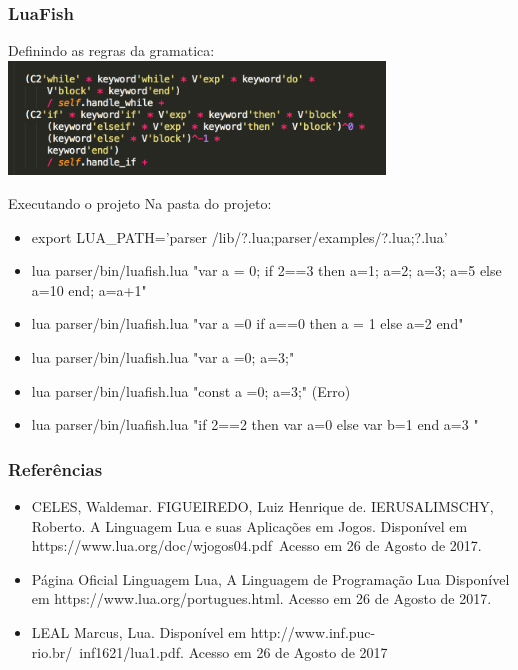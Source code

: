 \documentclass{beamer}
\begin{document}
\begin{frame}
    \frametitle{LuaFish}
    Definindo as regras da gramatica:\newline
    \includegraphics[width=10cm]{images/grammar_rule.png}
    \newline
    
\end{frame}


\begin{frame}{Executando o projeto}
    Na pasta do projeto:
    \begin{itemize} 
        \item export LUA\_PATH='parser /lib/?.lua;parser/examples/?.lua;?.lua'
        \item lua parser/bin/luafish.lua "var a = 0; if 2==3 then a=1; a=2; a=3; a=5 else a=10 end; a=a+1"
        \item lua parser/bin/luafish.lua "var a =0 if a==0 then a = 1 else a=2 end"
        \item lua parser/bin/luafish.lua "var a =0; a=3;"
        \item lua parser/bin/luafish.lua "const a =0; a=3;" (Erro)
        \item lua parser/bin/luafish.lua "if 2==2 then var a=0 else var b=1 end a=3 "
    \end{itemize}
\end{frame}

\begin{frame}
    \frametitle{Referências}
    \begin{itemize}
        \item CELES, Waldemar. FIGUEIREDO, Luiz Henrique de. IERUSALIMSCHY, Roberto. A Linguagem Lua e suas Aplicações em Jogos. Disponível em https://www.lua.org/doc/wjogos04.pdf\  Acesso em 26 de Agosto de 2017.
        \item Página Oficial Linguagem Lua, A Linguagem de Programação Lua Disponível em https://www.lua.org/portugues.html. Acesso em 26 de Agosto de 2017.
        \item LEAL Marcus, Lua. Disponível em http://www.inf.puc-rio.br/~inf1621/lua1.pdf. Acesso em 26 de Agosto de 2017
    \end{itemize}
\end{frame}
\end{document}
